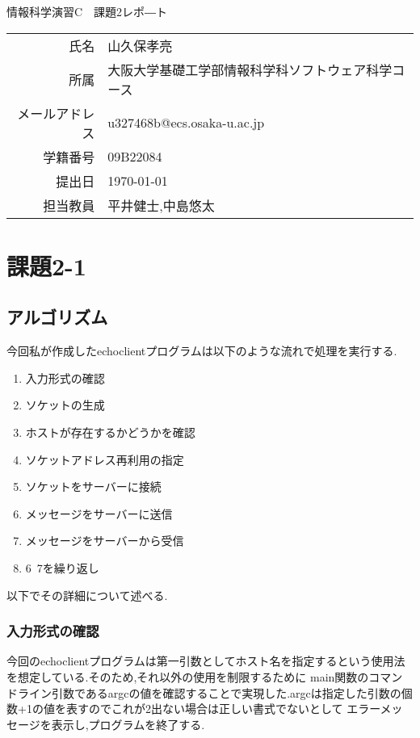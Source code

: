 \documentclass[dvipdfmx]{jarticle}
\begin{document}
\begin{titlepage}
    \begin{center}
        {\huge 情報科学演習C　課題2レポ―ト}
        \vspace{180pt}\\
        \begin{tabular}{rl}
            氏名 & 山久保孝亮\\
            所属 & 大阪大学基礎工学部情報科学科ソフトウェア科学コース\\
            メールアドレス & u327468b@ecs.osaka-u.ac.jp\\
            学籍番号 & 09B22084\\
            提出日 & \today\\
            担当教員 & 平井健士,中島悠太
        \end{tabular}
    \end{center}
\end{titlepage}
\section{課題2-1}
\subsection{アルゴリズム}
今回私が作成したechoclientプログラムは以下のような流れで処理を実行する.

\begin{enumerate}
    \item 入力形式の確認
    \item ソケットの生成
    \item ホストが存在するかどうかを確認
    \item ソケットアドレス再利用の指定
    \item ソケットをサーバーに接続
    \item メッセージをサーバーに送信
    \item メッセージをサーバーから受信
    \item 6~7を繰り返し
\end{enumerate}
以下でその詳細について述べる.
\subsubsection{入力形式の確認}
今回のechoclientプログラムは第一引数としてホスト名を指定するという使用法を想定している.そのため,それ以外の使用を制限するために
main関数のコマンドライン引数であるargcの値を確認することで実現した.argcは指定した引数の個数+1の値を表すのでこれが2出ない場合は正しい書式でないとして
エラーメッセージを表示し,プログラムを終了する.
\end{document}
